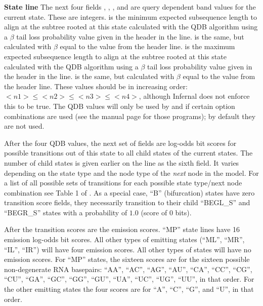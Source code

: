 \begin{sreitems}{\textbf{State line}}
  The next four fields , , , and
   are query dependent band values for the current
  state. These are integers.  is the minimum expected
  subsequence length to align at the subtree rooted at this state
  calculated with the QDB algorithm \citep{NawrockiEddy07} using a
  $\beta$ tail loss probability value given in the header in the
   line.  is the same, but calculated with
  $\beta$ equal to the value from the  header line. 
   is the maximum expected
  subsequence length to align at the subtree rooted at this state
  calculated with the QDB algorithm \citep{NawrockiEddy07} using a
  $\beta$ tail loss probability value given in the header in the
   line.  is the same, but calculated with
  $\beta$ equal to the value from the  header line. 
  These values should be in increasing order: $<n1> \leq <n2> \leq
  <n3> \leq <n4>$, although Infernal does not enforce this to be
  true. The QDB values will only be used by  and
   if certain option combinations are used (see the
  manual page for those programs); by default they are not used.

  After the four QDB values, the next set of fields are log-odds bit
  scores for possible transitions out of this state to all child
  states of the current states. The number of child states is given
  earlier on the line as the sixth field. It varies depending on the
  state type and the node type of the \emph{next} node in the model.
  For a list of all possible sets of transitions for each possible
  state type/next node combination see Table 1 of
  \citep{NawrockiEddy07}. As a special case, ``B'' (bifurcation) states
  have zero transition score fields, they necessarily transition to
  their child ``BEGL\_S'' and ``BEGR\_S'' states with a probability of
  $1.0$ (score of $0$ bits).

  After the transition scores are the emission scores. 
  ``MP'' state lines have 16 emission log-odds bit scores. All other
  types of emitting states (``ML'', ``MR'', ``IL'', ``IR'') will have
  four emission scores. All other types of states will have no
  emission scores. For ``MP'' states, the sixteen scores are for the
  sixteen possible non-degenerate RNA basepairs: ``AA'', ``AC'',
  ``AG'', ``AU'', ``CA'', ``CC'', ``CG'', ``CU'', ``GA'', ``GC'',
  ``GG'', ``GU'', ``UA'', ``UC'', ``UG'', ``UU'', in that order. 
  For the other emitting states the four scores are for ``A'', ``C'',
  ``G'', and ``U'', in that order.
\end{sreitems}

